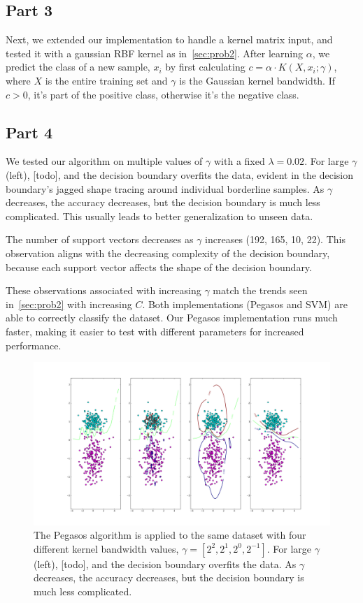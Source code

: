 \subsection{Part 3}
Next, we extended our implementation to handle a kernel matrix input, and tested it with a gaussian RBF kernel as in~\cref{sec:prob2}.
After learning $\alpha$, we predict the class of a new sample, $x_i$ by first calculating $c = \alpha \cdot K(X, x_i; \gamma)$, where $X$ is the entire training set and $\gamma$ is the Gaussian kernel bandwidth.
If $c > 0$, it's part of the positive class, otherwise it's the negative class.

\subsection{Part 4}
We tested our algorithm on multiple values of $\gamma$ with a fixed $\lambda=0.02$.
For large $\gamma$ (left), [todo], and the decision boundary overfits the data, evident in the decision boundary's jagged shape tracing around individual borderline samples.
As $\gamma$ decreases, the accuracy decreases, but the decision boundary is much less complicated.
This usually leads to better generalization to unseen data.

The number of support vectors decreases as $\gamma$ increases (192, 165, 10, 22).
This observation aligns with the decreasing complexity of the decision boundary, because each support vector affects the shape of the decision boundary.

These observations associated with increasing $\gamma$ match the trends seen in~\cref{sec:prob2} with increasing $C$.
Both implementations (Pegasos and SVM) are able to correctly classify the dataset.
Our Pegasos implementation runs much faster, making it easier to test with different parameters for increased performance.


\begin{figure}
	\centering
	\includegraphics [trim=0 0 0 0, clip, angle=0, width=0.8\columnwidth,
	keepaspectratio]{figures/3_3_decisions}
	\caption{The Pegasos algorithm is applied to the same dataset with four different kernel bandwidth values, $\gamma = [2^2, 2^1, 2^0, 2^{-1}]$. For large $\gamma$ (left), [todo], and the decision boundary overfits the data. As $\gamma$ decreases, the accuracy decreases, but the decision boundary is much less complicated.}
	\label{fig:3_3_decisions} 
\end{figure}